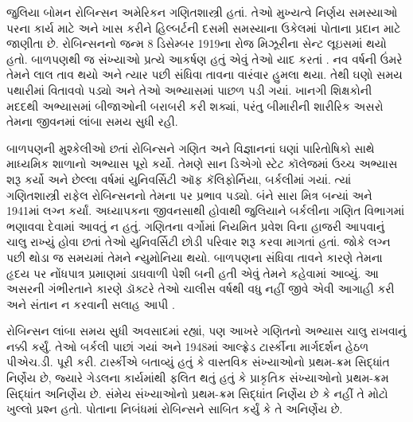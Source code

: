 \documentclass[../../../include/open-logic-section]{subfiles}
\begin{document}



જુલિયા બોમન રોબિન્સન અમેરિકન ગણિતશાસ્ત્રી
હતાં. તેઓ મુખ્યત્વે નિર્ણય સમસ્યાઓ પરના
કાર્ય માટે અને ખાસ કરીને હિલ્બર્ટની
દસમી સમસ્યાના ઉકેલમાં પોતાના પ્રદાન
માટે જાણીતા છે. રોબિન્સનનો જન્મ
8 ડિસેમ્બર 1919ના રોજ મિઝૂરીના
સેન્ટ લૂઇસમાં થયો હતો. બાળપણથી જ
સંખ્યાઓ પ્રત્યે આકર્ષણ હતું એવું
તેઓ યાદ કરતાં \citep[4]{Reid1986}.
નવ વર્ષની ઉંમરે તેમને લાલ તાવ
થયો અને ત્યાર પછી સંધિવા તાવના
વારંવાર હુમલા થયા. તેથી ઘણો
સમય પથારીમાં વિતાવવો પડ્યો અને
તેઓ અભ્યાસમાં પાછળ પડી ગયાં.
ખાનગી શિક્ષકોની મદદથી અભ્યાસમાં
બીજાઓની બરાબરી કરી શક્યાં,
પરંતુ બીમારીની શારીરિક અસરો
તેમના જીવનમાં લાંબા સમય
સુધી રહી.

બાળપણની મુશ્કેલીઓ છતાં
રોબિન્સને ગણિત અને વિજ્ઞાનનાં
ઘણાં પારિતોષિકો સાથે માધ્યમિક
શાળાનો અભ્યાસ પૂરો કર્યો.
તેમણે સાન ડિએગો સ્ટેટ કૉલેજમાં
ઉચ્ચ અભ્યાસ શરૂ કર્યો અને
છેલ્લા વર્ષમાં યુનિવર્સિટી ઑફ
કૅલિફોર્નિયા, બર્કલીમાં ગયાં.
ત્યાં ગણિતશાસ્ત્રી રાફેલ
રોબિન્સનનો તેમના પર પ્રભાવ
પડ્યો. બંને સારા મિત્ર બન્યાં
અને 1941માં લગ્ન કર્યાં.
અધ્યાપકના જીવનસાથી હોવાથી
જુલિયાને બર્કલીના ગણિત
વિભાગમાં ભણાવવા દેવામાં
આવતું ન હતું. ગણિતના
વર્ગોમાં નિયમિત પ્રવેશ વિના
હાજરી આપવાનું ચાલુ રાખ્યું
હોવા છતાં તેઓ યુનિવર્સિટી
છોડી પરિવાર શરૂ કરવા માગતાં
હતાં. જોકે લગ્ન પછી થોડા
જ સમયમાં તેમને ન્યુમોનિયા
થયો. બાળપણના સંધિવા
તાવને કારણે તેમના હૃદય
પર નોંધપાત્ર પ્રમાણમાં
ડાઘવાળી પેશી બની હતી એવું તેમને
કહેવામાં આવ્યું. આ
અસરની ગંભીરતાને કારણે
ડૉક્ટરે તેઓ ચાલીસ વર્ષથી
વધુ નહીં જીવે એવી આગાહી
કરી અને સંતાન ન કરવાની
સલાહ આપી \citep[13]{Reid1986}.

રોબિન્સન લાંબા સમય સુધી
અવસાદમાં રહ્યાં, પણ આખરે
ગણિતનો અભ્યાસ ચાલુ રાખવાનું
નક્કી કર્યું. તેઓ બર્કલી
પાછાં ગયાં અને 1948માં
આલ્ફ્રેડ ટાર્સ્કીના માર્ગદર્શન
હેઠળ પીએચ.ડી. પૂરી કરી.
ટાર્સ્કીએ બતાવ્યું હતું કે
વાસ્તવિક સંખ્યાઓનો પ્રથમ-ક્રમ
સિદ્ધાંત નિર્ણેય છે, જ્યારે
ગેડલના કાર્યમાંથી ફલિત થતું
હતું કે પ્રાકૃતિક સંખ્યાઓનો
પ્રથમ-ક્રમ સિદ્ધાંત અનિર્ણેય
છે. સંમેય સંખ્યાઓનો પ્રથમ-ક્રમ
સિદ્ધાંત નિર્ણેય છે કે નહીં
તે મોટો ખુલ્લો પ્રશ્ન હતો.
પોતાના નિબંધમાં
\citeyearpar{Robinson1949}
રોબિન્સને સાબિત કર્યું કે
તે અનિર્ણેય છે.
\end{document}
